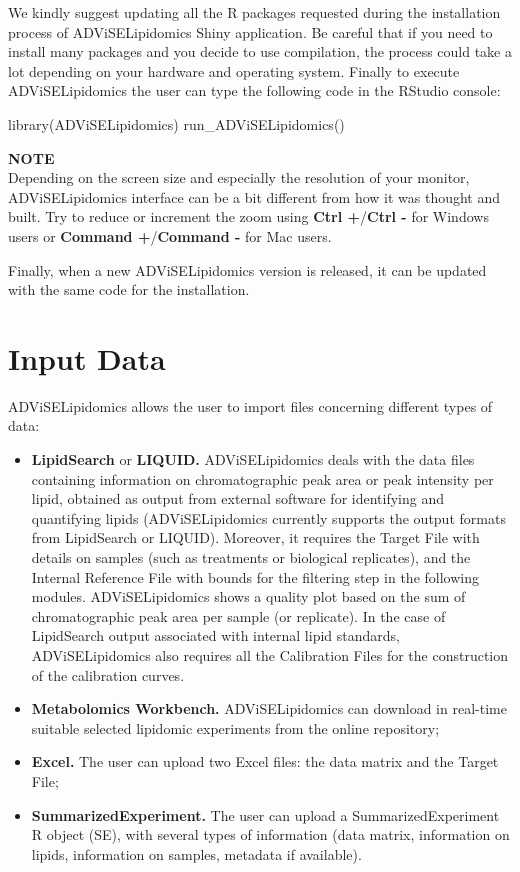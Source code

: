 \documentclass[
]{book}
\newenvironment{Shaded}{\begin{snugshade}}{\end{snugshade}}
\newcommand{\FunctionTok}[1]{\textcolor[rgb]{0.00,0.00,0.00}{#1}}
\newcommand{\NormalTok}[1]{#1}
\providecommand{\tightlist}{%
  \setlength{\itemsep}{0pt}\setlength{\parskip}{0pt}}
\begin{document}
We kindly suggest updating all the R packages requested during the installation process of ADViSELipidomics Shiny application. Be careful that if you need to install many packages and you decide to use compilation, the process could take a lot depending on your hardware and operating system.
Finally to execute ADViSELipidomics the user can type the following code in the RStudio console:

\begin{Shaded}
\begin{Highlighting}[]
\FunctionTok{library}\NormalTok{(ADViSELipidomics)}
\FunctionTok{run\_ADViSELipidomics}\NormalTok{()}
\end{Highlighting}
\end{Shaded}

\textbf{NOTE}\\
Depending on the screen size and especially the resolution of your monitor, ADViSELipidomics interface can be a bit different from how it was thought and built. Try to reduce or increment the zoom using \textbf{Ctrl +}/\textbf{Ctrl -} for Windows users or \textbf{Command +}/\textbf{Command -} for Mac users.

Finally, when a new ADViSELipidomics version is released, it can be updated with the same code for the installation.

\hypertarget{inputdata}{%
\chapter{Input Data}\label{inputdata}}

ADViSELipidomics allows the user to import files concerning different types of data:

\begin{itemize}
\tightlist
\item
  \textbf{LipidSearch} or \textbf{LIQUID.} ADViSELipidomics deals with the data files containing information on chromatographic peak area or peak intensity per lipid, obtained as output from external software for identifying and quantifying lipids (ADViSELipidomics currently supports the output formats from LipidSearch or LIQUID). Moreover, it requires the Target File with details on samples (such as treatments or biological replicates), and the Internal Reference File with bounds for the filtering step in the following modules. ADViSELipidomics shows a quality plot based on the sum of chromatographic peak area per sample (or replicate). In the case of LipidSearch output associated with internal lipid standards, ADViSELipidomics also requires all the Calibration Files for the construction of the calibration curves.
\item
  \textbf{Metabolomics Workbench.} ADViSELipidomics can download in real-time suitable selected lipidomic experiments from the online repository;
\item
  \textbf{Excel.} The user can upload two Excel files: the data matrix and the Target File;
\item
  \textbf{SummarizedExperiment.} The user can upload a SummarizedExperiment R object (SE), with several types of information (data matrix, information on lipids, information on samples, metadata if available).
\end{itemize}
\end{document}
